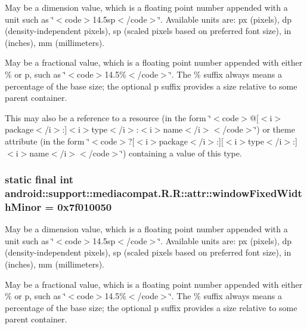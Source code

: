 May be a dimension value, which is a floating point number appended with a unit such as \char`\"{}$<$code$>$14.5sp$<$/code$>$\char`\"{}. Available units are: px (pixels), dp (density-independent pixels), sp (scaled pixels based on preferred font size), in (inches), mm (millimeters). 

May be a fractional value, which is a floating point number appended with either \% or p, such as \char`\"{}$<$code$>$14.5\%$<$/code$>$\char`\"{}. The \% suffix always means a percentage of the base size; the optional p suffix provides a size relative to some parent container. 

This may also be a reference to a resource (in the form \char`\"{}$<$code$>$@\mbox{[}$<$i$>$package$<$/i$>$:\mbox{]}$<$i$>$type$<$/i$>$:$<$i$>$name$<$/i$>$$<$/code$>$\char`\"{}) or theme attribute (in the form \char`\"{}$<$code$>$?\mbox{[}$<$i$>$package$<$/i$>$:\mbox{]}\mbox{[}$<$i$>$type$<$/i$>$:\mbox{]}$<$i$>$name$<$/i$>$$<$/code$>$\char`\"{}) containing a value of this type. \hypertarget{classandroid_1_1support_1_1mediacompat_1_1_r_1_1attr_c36a7ca55cbcade16739fb3f8c72cf37}{
\subsubsection[{windowFixedWidthMinor}]{\setlength{\rightskip}{0pt plus 5cm}static final int android::support::mediacompat.R.R::attr::windowFixedWidthMinor = 0x7f010050}}
\label{classandroid_1_1support_1_1mediacompat_1_1_r_1_1attr_c36a7ca55cbcade16739fb3f8c72cf37}


May be a dimension value, which is a floating point number appended with a unit such as \char`\"{}$<$code$>$14.5sp$<$/code$>$\char`\"{}. Available units are: px (pixels), dp (density-independent pixels), sp (scaled pixels based on preferred font size), in (inches), mm (millimeters). 

May be a fractional value, which is a floating point number appended with either \% or p, such as \char`\"{}$<$code$>$14.5\%$<$/code$>$\char`\"{}. The \% suffix always means a percentage of the base size; the optional p suffix provides a size relative to some parent container. 

